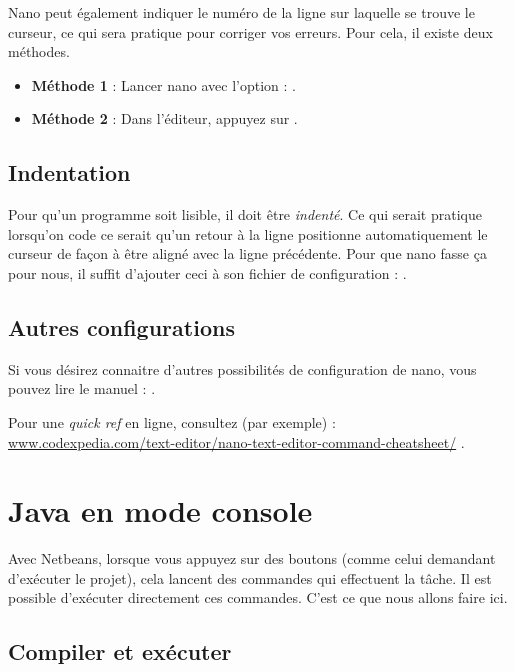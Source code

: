 \documentclass[a4paper,11pt]{style-esi/td}
\begin{document}
		Nano peut également indiquer le numéro de la ligne sur laquelle se trouve le curseur, 
		ce qui sera pratique pour corriger vos erreurs. 
		Pour cela, il existe deux méthodes.

		\begin{itemize} 
		\item \textbf{Méthode 1} : 
			Lancer nano avec l'option  : .
		\item \textbf{Méthode 2} : 
			Dans l'éditeur, appuyez sur .
		\end{itemize}
			
	\subsection{Indentation}
				 
		Pour qu'un programme soit lisible, 
		il doit être \textit{indenté}. 
		Ce qui serait pratique lorsqu'on code ce serait qu'un retour à la ligne 
		positionne automatiquement le curseur de façon à être aligné avec la ligne précédente. 
		Pour que nano fasse ça pour nous, 
		il suffit d'ajouter	ceci à son fichier de configuration : .
			
	\subsection{Autres configurations} 
		
		Si vous désirez connaitre d'autres possibilités de configuration de nano, 
		vous pouvez lire le manuel : .

		Pour une \textit{quick ref} en ligne, consultez (par exemple) : \\
		\url{www.codexpedia.com/text-editor/nano-text-editor-command-cheatsheet/}
		.

\section{Java en mode console}

	Avec Netbeans, lorsque vous appuyez sur des boutons
	(comme celui demandant d'exécuter le projet),
	cela lancent des commandes qui effectuent la tâche.
	Il est possible d'exécuter directement ces commandes.
	C'est ce que nous allons faire ici.

	\subsection{Compiler et exécuter}
\end{document}
